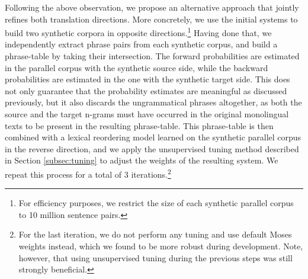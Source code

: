 \documentclass[11pt,a4paper]{article}
\begin{document}
Following the above observation, we propose an alternative approach that jointly refines both translation directions. More concretely, we use the initial systems to build two synthetic corpora in opposite directions.\footnote{For efficiency purposes, we restrict the size of each synthetic parallel corpus to 10 million sentence pairs.} Having done that, we independently extract phrase pairs from each synthetic corpus, and build a phrase-table by taking their intersection. The forward probabilities are estimated in the parallel corpus with the synthetic source side, while the backward probabilities are estimated in the one with the synthetic target side. This does not only guarantee that the probability estimates are meaningful as discussed previously, but it also discards the ungrammatical phrases altogether, as both the source and the target n-grams must have occurred in the original monolingual texts to be present in the resulting phrase-table. This phrase-table is then combined with a lexical reordering model learned on the synthetic parallel corpus in the reverse direction, and we apply the unsupervised tuning method described in Section \ref{subsec:tuning} to adjust the weights of the resulting system. We repeat this process for a total of 3 iterations.\footnote{For the last iteration, we do not perform any tuning and use default Moses weights instead, which we found to be more robust during development. Note, however, that using unsupervised tuning during the previous steps was still strongly beneficial.}
\end{document}

